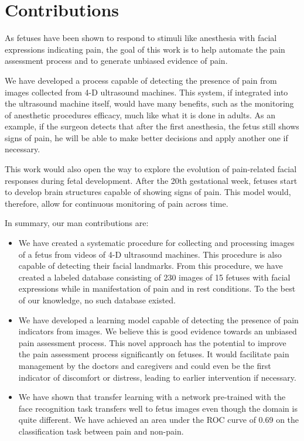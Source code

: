 \section{Contributions}

As fetuses have been shown to respond to stimuli like anesthesia with facial expressions indicating pain, the goal of this work is to help automate the pain assessment process and to generate unbiased evidence of pain. 

We have developed a process capable of detecting the presence of pain from images collected from 4-D ultrasound machines. This system, if integrated into the ultrasound machine itself, would have many benefits, such as the monitoring of anesthetic procedures efficacy, much like what it is done in adults. As an example, if the surgeon detects that after the first anesthesia, the fetus still shows signs of pain, he will be able to make better decisions and apply another one if necessary.

This work would also open the way to explore the evolution of pain-related facial responses during fetal development. After the 20th gestational week, fetuses start to develop brain structures capable of showing signs of pain. This model would, therefore, allow for continuous monitoring of pain across time.

In summary, our man contributions are:

\begin{itemize}
    \item We have created a systematic procedure for collecting and processing images of a fetus from videos of 4-D ultrasound machines. This procedure is also capable of detecting their facial landmarks. From this procedure, we have created a labeled database consisting of 230 images of 15 fetuses with facial expressions while in manifestation of pain and in rest conditions. To the best of our knowledge, no such database existed.
    
    \item We have developed a learning model capable of detecting the presence of pain indicators from images. We believe this is good evidence towards an unbiased pain assessment process. This novel approach has the potential to improve the pain assessment process significantly on fetuses. It would facilitate pain management by the doctors and caregivers and could even be the first indicator of discomfort or distress, leading to earlier intervention if necessary.
    
    \item We have shown that transfer learning with a network pre-trained with the face recognition task transfers well to fetus images even though the domain is quite different. We have achieved an area under the ROC curve of 0.69 on the classification task between pain and non-pain.
\end{itemize}

